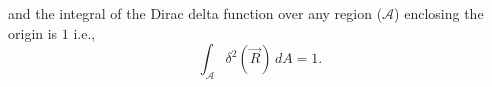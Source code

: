 \documentclass{esg8022pset}
\newcommand{\Kgrad}{\left(\hat{x} \frac{\partial}{\partial x} + \hat{y} \frac{\partial}{\partial y} + \hat{z} \frac{\partial}{\partial z}\right)}
\newcommand{\KKdiv}[6]{{#4}\left(\frac{\partial}{\partial x}{#1} {#5} \frac{\partial}{\partial y}{#2} {#6}\frac{\partial}{\partial z}{#3} \right)}
\newcommand{\dtheta}{\frac{\partial}{\partial \theta}}
\newcommand{\dr}{\frac{\partial}{\partial r}}
\begin{document}
\begin{solution}
\begin{enumerate}[(a)]
\begin{enumerate}[(i)]
          and the integral of the Dirac delta function over any region ($\mathcal A$) enclosing the origin is $1$ i.e.,
          $$\int_{\mathcal A}\delta^2(\vec{R})\,dA = 1.$$
      \end{enumerate}
  \end{enumerate}
\end{solution}
\end{document}
